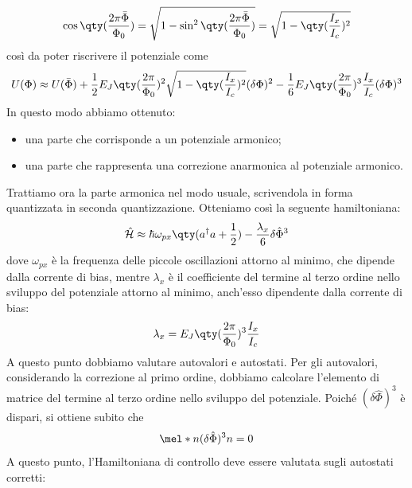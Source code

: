 \begin{equation*}
    \cos{ \qty( \frac{2 \pi \bar{\Phi}}{\Phi_0} ) } 
    =\sqrt{1 - \sin^2{ \qty( \frac{2 \pi \bar{\Phi}}{\Phi_0} ) }}
    =\sqrt{1 - \qty( \frac{I_x}{I_c} )^2 }
\end{equation*}
così da poter riscrivere il potenziale come
\begin{equation*}
    U(\Phi)
    \approx U(\bar{\Phi})
    + \frac{1}{2} E_J \qty( \frac{2 \pi}{\Phi_0} )^2 \sqrt{1 - \qty( \frac{I_x}{I_c} )^2 } (\delta\Phi)^2
    - \frac{1}{6} E_J \qty( \frac{2 \pi}{\Phi_0} )^3 \frac{I_x}{I_c} (\delta\Phi)^3
\end{equation*}
In questo modo abbiamo ottenuto:
\begin{itemize}[leftmargin=0.5cm]
    \item una parte che corrisponde a un potenziale armonico;
    \item una parte che rappresenta una correzione anarmonica al potenziale armonico.
\end{itemize}
Trattiamo ora la parte armonica nel modo usuale, scrivendola in forma quantizzata in seconda quantizzazione. Otteniamo così la seguente hamiltoniana:
\begin{equation*}
    \hat{\mathcal{H}}
    \approx \hbar \omega_{px} \qty( a^\dagger a + \frac{1}{2} ) - \frac{\lambda_x}{6} \delta \hat{\Phi}^3
\end{equation*}
dove $\omega_{px}$ è la frequenza delle piccole oscillazioni attorno al minimo, che dipende dalla corrente di bias, mentre $\lambda_x$ è il coefficiente del termine al terzo ordine nello sviluppo del potenziale attorno al minimo, anch'esso dipendente dalla corrente di bias:
\begin{equation*}
    \lambda_x
    = E_J \qty( \frac{2 \pi}{\Phi_0} )^3 \frac{I_x}{I_c}
\end{equation*}
A questo punto dobbiamo valutare autovalori e autostati. Per gli autovalori, considerando la correzione al primo ordine, dobbiamo calcolare l'elemento di matrice del termine al terzo ordine nello sviluppo del potenziale. Poiché $(\delta \hat{\Phi})^3$ è dispari, si ottiene subito che
\begin{equation*}
    \mel*{n}{(\delta \hat{\Phi})^3}{n}=0
\end{equation*}
A questo punto, l'Hamiltoniana di controllo deve essere valutata sugli autostati corretti:
